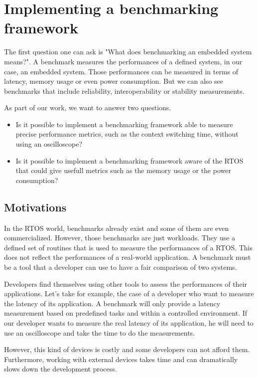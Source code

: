 \section{Implementing a benchmarking framework}

The first question one can ask is "What does benchmarking an embedded system means?".
A benchmark measures the performances of a defined system, in our case, an embedded system.
Those performances can be measured in terms of latency, memory usage or even power consumption.
But we can also see benchmarks that include reliability, interoperability or stability measurements.

As part of our work, we want to answer two questions.

\begin{itemize}
  \item Is it possible to implement a benchmarking framework able to measure precise performance metrics, such as the context switching time, without using an oscilloscope?
  \item Is it possible to implement a benchmarking framework aware of the RTOS that could give usefull metrics such as the memory usage or the power consumption? %
\end{itemize}

\subsection{Motivations}

In the RTOS world, benchmarks already exist and some of them are even commercialized. \cite{mibench, parmibench, performance-benchmarking}
However, those benchmarks are just workloads.
They use a defined set of routines that is used to measure the performances of a RTOS.
This does not reflect the performances of a real-world application.
A benchmark must be a tool that a developer can use to have a fair comparison of two systems.

Developers find themselves using other tools to assess the performances of their applications.
Let's take for example, the case of a developer who want to measure the latency of its application.
A benchmark will only provide a latency measurement based on predefined tasks and within a controlled environment.
If our developer wants to measure the real latency of its application, he will need to use an oscilloscope and take the time to do the measurements.

However, this kind of devices is costly and some developers can not afford them.
Furthermore, working with external devices takes time and can dramatically slows down the development process.

